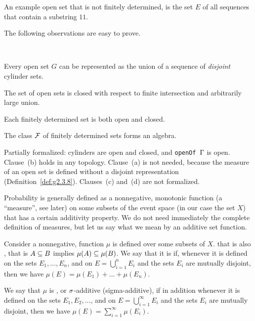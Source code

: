 \begin{example}
An example open set that is not finitely determined, is the set \( E \) of all sequences that
contain a substring \( 11 \).
\end{example}

The following observations are easy to prove.

\begin{proposition}\
  \label{prop:g2.3.3}
  \uses{def:g2.3.1}
  \begin{alphenum}
 \item
 Every open set \( G \) can be represented as the union of a sequence of \emph{disjoint}
cylinder sets.
 \item
The set of open sets is closed with respect to finite intersection
and arbitrarily large union.
  \item
 Each finitely determined set is both open and closed.
 \item
The class \( \mathcal{F} \) of finitely determined sets forms an algebra.
 \end{alphenum}
\end{proposition}

\begin{formalization}
Partially formalized: cylinders are open and closed, and \texttt{openOf \( \Gamma \)} is open.
Clause~(b) holds in any topology. Clause~(a) is not needed, because the measure of an open
set is defined without a disjoint representation (Definition~\ref{def:g2.3.8}).
Clauses~(c) and~(d) are not formalized.
\end{formalization}

Probability is generally defined as a nonnegative, monotonic
function (a ``measure'', see later) on some subsets of the event
space (in our case the set \( X \)) that has a certain additivity property.
We do not need immediately the complete definition of measures, but let us say
what we mean by an additive set function.

\begin{definition}
  \label{def:g2.3.4}
  \notready
Consider a nonnegative, function \( \mu \) is defined over some subsets of \( X \).
that is also \df{monotonic}, that is \( A\subseteq B \) implies  \( \mu(A)\subseteq\mu(B) \).
We say that it is \df{additive} if,
whenever it is defined on the sets
\( E_{1},\dots,E_{n} \), and on \( E=\bigcup_{i=1}^{n}E_{i} \)
and the sets \( E_{i} \) are mutually disjoint, then we have
\( \mu(E)=\mu(E_{1})+\dots+\mu(E_{n}) \).

We say that \( \mu \) is , or \( \sigma \)-additive (sigma-additive),
if in addition whenever it is defined on the sets
\( E_{1},E_{2},\dots \), and on \( E=\bigcup_{i=1}^{\infty}E_{i} \)
and the sets \( E_{i} \) are mutually disjoint, then we have
\( \mu(E)=\sum_{i=1}^{\infty}\mu(E_{i}) \).
\end{definition}

